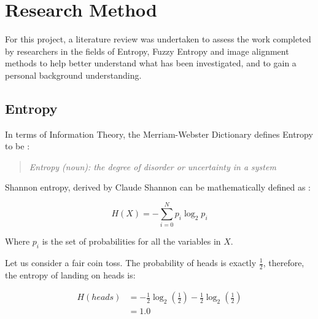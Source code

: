 \section{Research Method}


For this project, a literature review was undertaken to assess the work completed by researchers in the fields of Entropy, Fuzzy Entropy and image alignment methods to help better understand what has been investigated, and to gain a personal background understanding.

\subsection{Entropy}

In terms of Information Theory, the Merriam-Webster Dictionary defines Entropy to be \cite{def_entropy}:

\begin{quotation}
 \textit{Entropy (noun): the degree of disorder or uncertainty in a system}
\end{quotation}

Shannon entropy, derived by Claude Shannon \cite{shannon1948a} can be mathematically defined as :

\begin{equation}
  H(X) = - \displaystyle\sum_{i=0}^{N}{p_i \log_2 p_i}
\end{equation}

Where $p_i$ is the set of probabilities for all the variables in $X$.

Let us consider a fair coin toss. The probability of heads is exactly $\frac{1}{2}$, therefore, the entropy of landing on heads is:

\begin{equation}
  \begin{split}
    H(heads) &= -\frac{1}{2}\log_2(\frac{1}{2}) - \frac{1}{2}\log_2(\frac{1}{2}) \\
    &= 1.0
  \end{split}
\end{equation}

